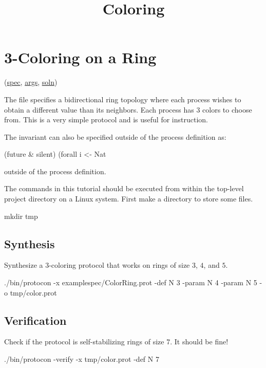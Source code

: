 
\title{Coloring}
\date{}



\tableofcontents

\section{3-Coloring on a Ring}
\label{sec:ColorRing}

(\href{\examplespec/ColorRing.prot}{spec},
\href{\examplesett/ColorRing.args}{args},
\href{\examplesoln/ColorRing.prot}{soln})

The  file specifies a bidirectional ring topology where each process wishes to obtain a different value than its neighbors.
Each process has $3$ colors to choose from.
This is a very simple protocol and is useful for instruction.

The invariant can also be specified outside of the process definition as:
\begin{code}
(future & silent)
  (forall i <- Nat %
\end{code}
outside of the process definition.

The commands in this tutorial should be executed from within the top-level project directory on a Linux system.
First make a directory  to store some files.
\begin{code}
mkdir tmp
\end{code}

\subsection{Synthesis}
Synthesize a 3-coloring protocol that works on rings of size $3$, $4$, and $5$.
\begin{code}
./bin/protocon -x examplespec/ColorRing.prot -def N 3 -param N 4 -param N 5 -o tmp/color.prot
\end{code}

\subsection{Verification}
Check if the protocol is self-stabilizing rings of size $7$. It should be fine!
\begin{code}
./bin/protocon -verify -x tmp/color.prot -def N 7
\end{code}

